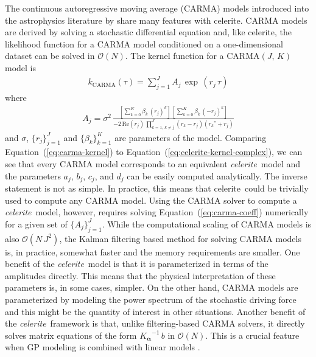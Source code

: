 \documentclass[manuscript, letterpaper]{aastex6}
\newcommand{\project}[1]{\textsf{#1}}
\newcommand{\celerite}{\project{celerite}}
\newcommand{\celeriteterm}{\emph{celerite}}
\renewcommand{\eqref}[1]{\ref{eq:#1}}
\newcommand{\Eq}[1]{Equation~(\eqref{#1})}
\newcommand{\eq}[1]{\Eq{#1}}
\newcommand{\eqlabel}[1]{\label{eq:#1}}
\newcommand{\bvec}[1]{{\ensuremath{\boldsymbol{#1}}}}
\begin{document}
The continuous autoregressive moving average (CARMA) models introduced into
the astrophysics literature by \citet{Kelly:2014} share many features with
\celerite.
CARMA models are derived by solving a stochastic differential equation and,
like \celerite, the likelihood function for a CARMA model conditioned on a
one-dimensional dataset can be solved in $\mathcal{O}(N)$.
The kernel function for a CARMA$(J,\,K)$ model is \citep{Kelly:2014}
\begin{eqnarray}\eqlabel{carma-kernel}
k_\mathrm{CARMA}(\tau) = \sum_{j=1}^J A_j\,\exp\,(r_j\,\tau)
\end{eqnarray}
where
\begin{eqnarray}\eqlabel{carma-coeff}
A_j = \sigma^2 \,\frac{\left[\sum_{k=0}^K\beta_k\,{(r_j)}^k\right]\,
    \left[\sum_{k=0}^K\beta_k\,{(-r_j)}^k\right]}
    {-2\,\mathrm{Re}(r_j)\,\prod_{k=1,\,k \ne j}^{J}(r_k-r_j)({r_k}^*+r_j)}
\end{eqnarray}
and $\sigma$, $\{r_j\}_{j=1}^J$ and $\{\beta_k\}_{k=1}^K$ are parameters of
the model.
Comparing \eq{carma-kernel} to \eq{celerite-kernel-complex}, we can see that
every CARMA model corresponds to an equivalent \celeriteterm\ model and the
parameters $a_j$, $b_j$, $c_j$, and $d_j$ can be easily computed analytically.
The inverse statement is not as simple.
In practice, this means that \celerite\ could be trivially used to compute any
CARMA model.
Using the CARMA solver to compute a \celeriteterm\ model, however, requires
solving \eq{carma-coeff} numerically for a given set of $\{A_j\}_{j=1}^J$.
While the computational scaling of CARMA models is also $\mathcal{O}(N\,J^2)$,
the Kalman filtering based method for solving CARMA models \citep{Kelly:2014}
is, in practice, somewhat faster and the memory requirements are smaller.
One benefit of the \celeriteterm\ model is that it is parameterized in terms
of the amplitudes directly.
This means that the physical interpretation of these parameters is, in some
cases, simpler.
On the other hand, CARMA models are parameterized by modeling the power
spectrum of the stochastic driving force and this might be the quantity of
interest in other situations.
Another benefit of the \celeriteterm\ framework is that, unlike
filtering-based CARMA solvers, it directly solves matrix equations of the form
${K_\bvec{\alpha}}^{-1}\,b$ in $\mathcal{O}(N)$.
This is a crucial feature when GP modeling is combined with linear models
\citep[for example][]{Luger:2017}.
\end{document}
